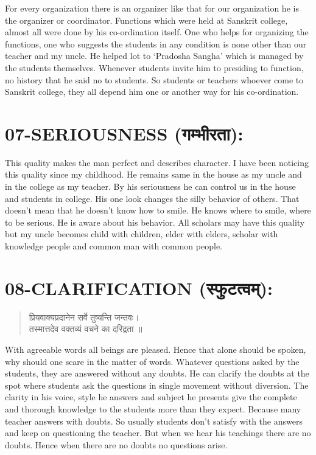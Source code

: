 For every organization there is an organizer like that for our organization he is the organizer or coordinator. Functions which were held at Sanskrit college, almost all were done by his co-ordination itself. One who helps for organizing the functions, one who suggests the students in any condition is none other than our teacher and my uncle.
He helped lot to ‘Pradosha Sangha’ which is managed by the students themselves. Whenever students invite him to presiding to function, no history that he said no to students. So students or teachers whoever come to Sanskrit college, they all depend him one or another way for his co-ordination.

\section*{07-SERIOUSNESS (गम्भीरता):}

This quality makes the man perfect and describes character. I have been noticing this quality since my childhood. He remains same in the house as my uncle and in the college as my teacher. By his seriousness he can control us in the house and students in college. His one look changes the silly behavior of others. That doesn’t mean that he doesn’t know how to smile. He knows where to smile, where to be serious. He is aware about his behavior. All scholars may have this quality but my uncle becomes child with children, elder with elders, scholar with knowledge people and common man with common people.

\section*{08-CLARIFICATION (स्फुटत्वम्):}
\begin{verse}
प्रियवाक्यप्रदानेन सर्वे तुष्यन्ति जन्तवः।\\
तस्मात्तदेव वक्तव्यं वचने का दरिद्रता ॥
\end{verse}
With agreeable words all beings are pleased. Hence that alone should be spoken, why should one scare in the matter of words.
Whatever questions asked by the students, they are answered without any doubts. He can clarify the doubts at the spot where students ask the questions in single movement without diversion. The clarity in his voice, style he answers and subject he presents give the complete and thorough knowledge to the students more than they expect. Because many teacher answers with doubts. So usually students don’t satisfy with the answers and keep on questioning the teacher. But when we hear his teachings there are no doubts. Hence when there are no doubts no questions arise.

